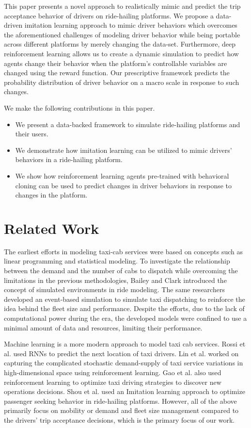 \documentclass[runningheads]{llncs}
\begin{document}
This paper presents a novel approach to realistically mimic and predict the trip acceptance behavior of drivers on ride-hailing platforms. We propose a data-driven imitation learning approach to mimic driver behaviors which overcomes the aforementioned challenges of modeling driver behavior while being portable across different platforms by merely changing the data-set. Furthermore, deep reinforcement learning allows us to create a dynamic simulation to predict how agents change their behavior when the platform’s controllable variables are changed using the reward function. Our prescriptive framework predicts the probability distribution of driver behavior on a macro scale in response to such changes.

We make the following contributions in this paper.
\begin{itemize}
\item We present a data-backed framework to simulate ride-hailing platforms and their users.
\item We demonstrate how imitation learning can be utilized to mimic drivers’ behaviors in a ride-hailing platform. 
\item We show how reinforcement learning agents pre-trained with behavioral cloning can be used to predict changes in driver behaviors in response to changes in the platform.
\end{itemize}


\section{Related Work}
The earliest efforts in modeling taxi-cab services were based on concepts such as linear programming and statistical modeling.  To investigate the relationship between the demand and the number of cabs to dispatch while overcoming the limitations in the previous methodologies, Bailey and Clark \cite{bailey1987} introduced the concept of simulated environments in ride modeling. The same researchers developed an event-based simulation \cite{bailey1992} to simulate taxi dispatching to reinforce the idea behind the fleet size and performance. Despite the efforts, due to the lack of computational power during the era, the developed models were confined to use a minimal amount of data and resources, limiting their performance.

Machine learning is a more modern approach to model taxi cab services. Rossi et al. \cite{rossi2019modelling} used RNNs to predict the next location of taxi drivers. Lin et al. \cite{lin2018} worked on capturing the complicated stochastic demand-supply of taxi service variations in high-dimensional space using reinforcement learning. Gao et al. \cite{gao2018optimize} also used reinforcement learning to optimize taxi driving strategies to discover new operations decisions. Shou et al. \cite{SHOU202091} used an Imitation learning approach to optimize passenger seeking behavior in ride-hailing platforms. However, all of the above primarily focus on mobility or demand and fleet size management compared to the drivers’ trip acceptance decisions, which is the primary focus of our work.
\end{document}
